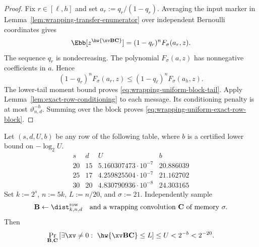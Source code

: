 \begin{proof}
Fix $r\in[\ell,h]$ and set $a_r:=q_r/(1-q_r)$.  Averaging the input marker in
Lemma~\ref{lem:wrapping-transfer-enumerator} over independent Bernoulli
coordinates gives
\[
 \Ebb[z^{\hw{\xv\B\C}}]=(1-q_r)^nF_\sigma(a_r,z).
\]
The sequence $q_r$ is nondecreasing.  The polynomial $F_\sigma(a,z)$ has
nonnegative coefficients in $a$.  Hence
\[
 (1-q_r)^nF_\sigma(a_r,z)
 \leq(1-q_\ell)^nF_\sigma(a_h,z).
\]
The lower-tail moment bound proves
\eqref{eq:wrapping-uniform-block-tail}.  Apply
Lemma~\ref{lem:exact-row-conditioning} to each message.  Its conditioning
penalty is at most $\vartheta_{n,d}^{-h}$.  Summing over the block proves
\eqref{eq:wrapping-uniform-exact-row-block}.
\end{proof}

\begin{theorem}
\label{thm:wrapped-ec-certified-exact-row}
Let $(s,d,U,b)$ be any row of the following table, where $b$ is a certified
lower bound on $-\log_2 U$.
\[
\begin{array}{c|c|c|c}
s&d&U&b\\ \hline
20&15&5.160307473\mathbin{\cdot}10^{-7}&20.886039\\
25&17&4.259825504\mathbin{\cdot}10^{-7}&21.162702\\
30&20&4.830790936\mathbin{\cdot}10^{-8}&24.303165
\end{array}
\]
Set $k:=2^s$, $n:=5k$, $L:=n/20$, and $\sigma:=21$.  Independently sample
\[
 \B\gets\dist^{\mathrm{row}}_{k,n,d}
 \quad\text{and a wrapping convolution }\C\text{ of memory }\sigma.
\]
Then
\begin{equation}
 \Pr_{\B,\C}\left[
   \exists\xv\neq0:\ \hw{\xv\B\C}\leq L
 \right]
 \leq U<2^{-b}<2^{-20}.
 \label{eq:wrapped-ec-certified-exact-row-result}
\end{equation}
\end{theorem}

